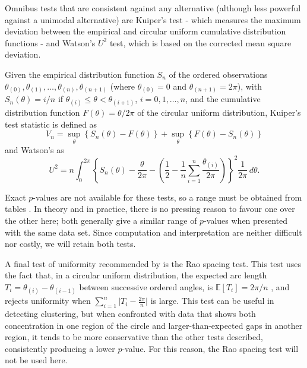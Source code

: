 \documentclass[../../ArchStats.tex]{subfiles}
\begin{document}
Omnibus tests that are consistent against any alternative (although less powerful against a unimodal alternative) are Kuiper's test - which measures the maximum deviation between the empirical and circular uniform cumulative distribution functions - and Watson's $U^2$ test, which is based on the corrected mean square deviation. 

Given the empirical distribution function $S_n$ of the ordered observations $\theta_{(0)}, \theta_{(1)}, \dots, \theta_{(n)}, \theta_{(n+1)}$ (where $\theta_{(0)} = 0$ and $\theta_{(n+1)} = 2\pi$), with $S_n(\theta) = i/n$ if $\theta_{(i)} \leq \theta < \theta_{(i+1)}$, $i = 0,1,\dots, n$, and the cumulative distribution function $F(\theta) = \theta/2\pi$ of the circular uniform distribution, Kuiper's test statistic is defined as
\begin{equation}
V_n = \sup_\theta \left\lbrace S_n(\theta) - F(\theta) \right\rbrace + 
\sup_\theta \left\lbrace F(\theta) - S_n(\theta) \right\rbrace 
\end{equation}
and Watson's as
\begin{equation}
U^2 = n \int_0^{2\pi} \left\lbrace S_n(\theta) - \frac{\theta}{2\pi} - \left(\frac{1}{2} - \frac{1}{n} \sum_{i=1}^n \frac{\theta_{(i)}}{2\pi} \right) \right\rbrace^2 \frac{1}{2\pi}\, d\theta.
\end{equation}

Exact $p$-values are not available for these tests, so a range must be obtained from tables \cite{Mardia1999}. In theory and in practice, there is no pressing reason to favour one over the other here; both generally give a similar range of $p$-values when presented with the same data set. Since computation and interpretation are neither difficult nor costly, we will retain both tests.

A final test of uniformity recommended by \cite{Pewsey2014} is the Rao spacing test. This test uses the fact that, in a circular uniform distribution, the expected arc length $T_i = \theta_{(i)} - \theta_{(i-1)}$ between successive ordered angles, is 
$\mathbb{E}\left[T_i\right] = 2\pi/n$ , and rejects uniformity when $\sum_{i=1}^n \vert T_i - \frac{2\pi}{n}\vert$ is large. This test can be useful in detecting clustering, but when confronted with data that shows both concentration in one region of the circle and larger-than-expected gaps in another region, it tends to be more conservative than the other tests described, consistently producing a lower $p$-value. For this reason, the Rao spacing test will not be used here.
\end{document}
